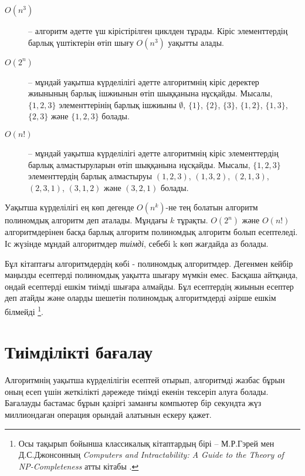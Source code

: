 \begin{description}
\item[$O(n^3)$] --
 алгоритм әдетте үш
кірістірілген циклден тұрады.
Кіріс элементтердің барлық үштіктерін
өтіп шығу $O(n^3)$ уақытты алады.

\item[$O(2^n)$] --
 мұндай
уақытша күрделілігі әдетте алгоритмнің кіріс деректер жиынының барлық 
ішжиынын өтіп шыққанына нұсқайды. Мысалы, $\{1,2,3\}$ элементтерінің барлық ішжиыны
$\emptyset$, $\{1\}$, $\{2\}$, $\{3\}$, $\{1,2\}$,
$\{1,3\}$, $\{2,3\}$ және $\{1,2,3\}$ болады.

\item[$O(n!)$] --
мұндай уақытша күрделілігі әдетте алгоритмнің кіріс элементтердің барлық 
алмастыруларын өтіп шыққанына нұсқайды. Мысалы, $\{1,2,3\}$ элементтердің барлық алмастыруы
$(1,2,3)$, $(1,3,2)$, $(2,1,3)$, $(2,3,1)$,
$(3,1,2)$ және $(3,2,1)$ болады.

\end{description}

Уақытша күрделілігі ең көп дегенде $O(n^k)$-не тең болатын алгоритм полиномдық алгоритм деп аталады. Мұндағы $k$ тұрақты.
$O(2^n)$ және $O(n!)$ алгоритмдерінен басқа барлық
алгоритм полиномдық алгоритм болып есептеледі. 
Іс жүзінде мұндай алгоритмдер \emph{тиімді}, себебі k көп жағдайда аз болады.


Бұл кітаптағы алгоритмдердің көбі - полиномдық алгоритмдер.
Дегенмен кейбір маңызды есептерді полиномдық уақытта шығару мүмкін емес. Басқаша айтқанда, ондай есептерді ешкім тиімді шығара алмайды. Бұл есептердің жиынын  есептер деп атайды және оларды шешетін полиномдық алгоритмдерді әзірше ешкім білмейді \footnote{
Осы тақырып бойынша классикалық кітаптардың бірі --
М.Р.Гэрей мен Д.С.Джонсонның
\emph{Computers and Intractability: A Guide to the Theory
of NP-Completeness} атты кітабы \cite{gar79}.}.

\section{Тиімділікті бағалау}

Алгоритмнің уақытша күрделілігін есептей отырып, 
алгоритмді жазбас бұрын оның есеп үшін жеткілікті дәрежеде тиімді екенін тексеріп алуға болады.
Бағалауды бастамас бұрын қазіргі заманғы 
компьютер бір секундта жүз миллиондаған операция
орындай алатынын ескеру қажет.

